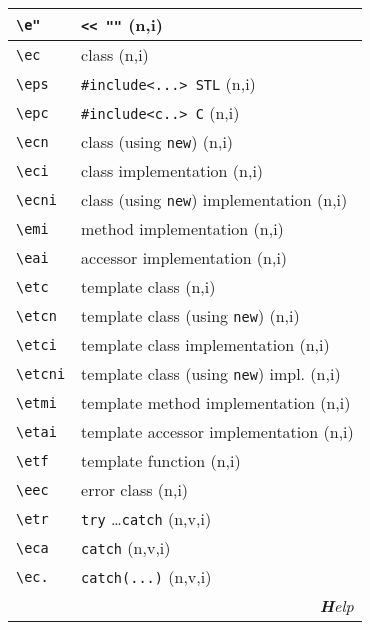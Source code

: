 \documentclass[oneside,11pt,landscape,DIV17]{scrartcl}
\begin{document}
\begin{multicols}{3}
\begin{center}
\begin{tabular}[]{|p{12mm}|p{60mm}|}
\hline \verb'\e"'   & \verb'<< ""'                \hfill (n,i)\\
\hline \verb'\ec'   & class                                   \hfill (n,i)\\
\hline \verb'\eps'  & \verb$#include<...> STL$                \hfill (n,i)\\
\hline \verb'\epc'  & \verb$#include<c..> C$                  \hfill (n,i)\\
\hline \verb'\ecn'  & class (using \verb'new')                \hfill (n,i)\\
\hline \verb'\eci'  & class  implementation                   \hfill (n,i)\\
\hline \verb'\ecni' & class (using \verb'new') implementation \hfill (n,i)\\
\hline \verb'\emi'  & method implementation                   \hfill (n,i)\\
\hline \verb'\eai'  & accessor implementation                 \hfill (n,i)\\
\hline \verb'\etc'  & template class                          \hfill (n,i)\\
\hline \verb'\etcn' & template class (using \verb'new')       \hfill (n,i)\\
\hline \verb'\etci' & template class  implementation          \hfill (n,i)\\
\hline \verb'\etcni'& template class (using \verb'new') impl. \hfill (n,i)\\
\hline \verb'\etmi' & template method implementation          \hfill (n,i)\\
\hline \verb'\etai' & template accessor implementation        \hfill (n,i)\\
\hline \verb'\etf'  & template function                       \hfill (n,i)\\
\hline \verb'\eec'  & error class                             \hfill (n,i)\\
\hline \verb'\etr'  & \verb'try' \dots \verb'catch'           \hfill (n,v,i)\\
\hline \verb'\eca'  & \verb'catch'                            \hfill (n,v,i)\\
\hline \verb'\ec.'  & \verb'catch(...)'                       \hfill (n,v,i)\\
\hline
\hline
\multicolumn{2}{|r|}{\textsl{\textbf{H}elp}}\\

\end{tabular}
\end{center}
\end{multicols}
\end{document}
